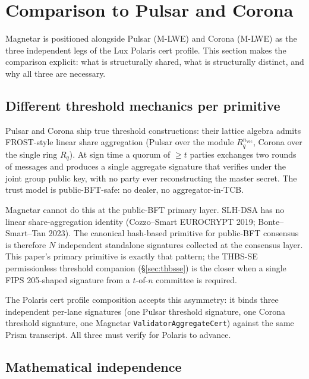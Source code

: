 \section{Comparison to Pulsar and Corona}
\label{sec:comparison}

Magnetar is positioned alongside Pulsar (M-LWE) \cite{lp073pulsarpaper}
and Corona (M-LWE) \cite{lp104corona} as the three independent legs of
the Lux Polaris cert profile. This section makes the comparison
explicit: what is structurally shared, what is structurally distinct,
and why all three are necessary.

\subsection{Different threshold mechanics per primitive}
\label{sec:cmp:mechanics}

Pulsar and Corona ship true threshold constructions: their lattice
algebra admits FROST-style linear share aggregation (Pulsar over
the module $R_q^{n_{\mathrm{vec}}}$, Corona over the single ring
$R_q$). At sign time a quorum of $\ge t$ parties exchanges
two rounds of messages and produces a single aggregate signature
that verifies under the joint group public key, with no party
ever reconstructing the master secret. The trust model is
public-BFT-safe: no dealer, no aggregator-in-TCB.

Magnetar cannot do this at the public-BFT primary layer. SLH-DSA
has no linear share-aggregation identity (Cozzo--Smart EUROCRYPT
2019; Bonte--Smart--Tan 2023). The canonical hash-based primitive
for public-BFT consensus is therefore $N$ independent standalone
signatures collected at the consensus layer. This paper's primary
primitive is exactly that pattern; the THBS-SE permissionless
threshold companion (\S\ref{sec:thbsse}) is the closer when a
single FIPS 205-shaped signature from a $t$-of-$n$ committee is
required.

The Polaris cert profile composition accepts this asymmetry: it
binds three independent per-lane signatures (one Pulsar threshold
signature, one Corona threshold signature, one Magnetar
\texttt{ValidatorAggregateCert}) against the same Prism transcript.
All three must verify for Polaris to advance.

\subsection{Mathematical independence}
\label{sec:cmp:independence}

